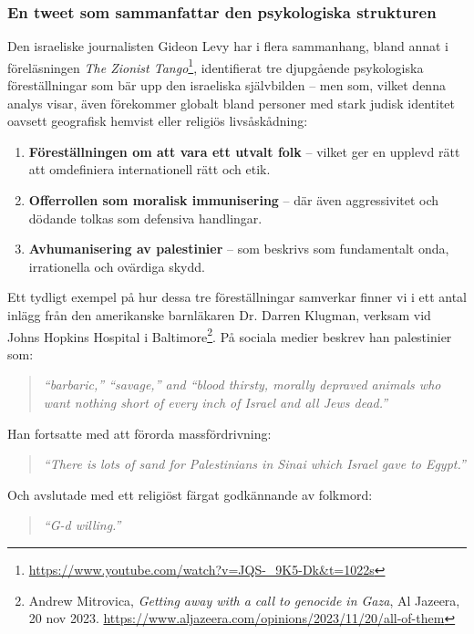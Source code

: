 \subsubsection*{En tweet som sammanfattar den psykologiska strukturen}

Den israeliske journalisten Gideon Levy har i flera sammanhang, bland annat i föreläsningen \textit{The Zionist Tango}\footnote{\url{https://www.youtube.com/watch?v=JQS-_9K5-Dk&t=1022s}}, identifierat tre djupgående psykologiska föreställningar som bär upp den israeliska självbilden – men som, vilket denna analys visar, även förekommer globalt bland personer med stark judisk identitet oavsett geografisk hemvist eller religiös livsåskådning:

\begin{enumerate}
    \item \textbf{Föreställningen om att vara ett utvalt folk} – vilket ger en upplevd rätt att omdefiniera internationell rätt och etik.
    \item \textbf{Offerrollen som moralisk immunisering} – där även aggressivitet och dödande tolkas som defensiva handlingar.
    \item \textbf{Avhumanisering av palestinier} – som beskrivs som fundamentalt onda, irrationella och ovärdiga skydd.
\end{enumerate}

Ett tydligt exempel på hur dessa tre föreställningar samverkar finner vi i ett antal inlägg från den amerikanske barnläkaren Dr. Darren Klugman, verksam vid Johns Hopkins Hospital i Baltimore\footnote{Andrew Mitrovica, \textit{Getting away with a call to genocide in Gaza}, Al Jazeera, 20 nov 2023. \url{https://www.aljazeera.com/opinions/2023/11/20/all-of-them}}. På sociala medier beskrev han palestinier som:

\begin{quote}
\textit{“barbaric,” “savage,” and “blood thirsty, morally depraved animals who want nothing short of every inch of Israel and all Jews dead.”}
\end{quote}

Han fortsatte med att förorda massfördrivning:
\begin{quote}
\textit{“There is lots of sand for Palestinians in Sinai which Israel gave to Egypt.”}
\end{quote}

Och avslutade med ett religiöst färgat godkännande av folkmord:
\begin{quote}
\textit{“G-d willing.”}
\end{quote}

